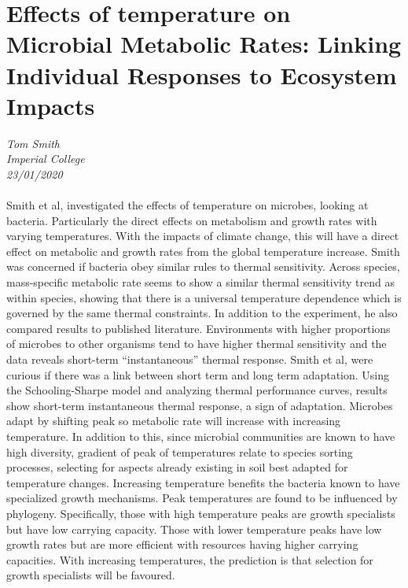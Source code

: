\documentclass[11pt]{article}
\begin{document}
\section{Effects of temperature on Microbial Metabolic Rates: Linking Individual Responses to Ecosystem Impacts}
\textit{Tom Smith\\Imperial College\\23/01/2020}
\\
\\Smith et al, investigated the effects of temperature on microbes, looking at bacteria. Particularly the direct effects on metabolism and growth rates with varying temperatures. With the impacts of climate change, this will have a direct effect on metabolic and growth rates from the global temperature increase. Smith was concerned if bacteria obey similar rules to thermal sensitivity. Across species, mass-specific metabolic rate seems to show a similar thermal sensitivity trend as within species, showing that there is a universal temperature dependence which is governed by the same thermal constraints. In addition to the experiment, he also compared results to published literature. Environments with higher proportions of microbes to other organisms tend to have higher thermal sensitivity and the data reveals short-term “instantaneous” thermal response. Smith et al, were curious if there was a link between short term and long term adaptation. Using the Schooling-Sharpe model and analyzing thermal performance curves, results show short-term instantaneous thermal response, a sign of adaptation. Microbes adapt by shifting peak so metabolic rate will increase with increasing temperature. In addition to this, since microbial communities are known to have high diversity, gradient of peak of temperatures relate to species sorting processes, selecting for aspects already existing in soil best adapted for temperature changes. Increasing temperature benefits the bacteria known to have specialized growth mechanisms. Peak temperatures are found to be influenced by phylogeny. Specifically, those with high temperature peaks are growth specialists but have low carrying capacity. Those with lower temperature peaks have low growth rates but are more efficient with resources having higher carrying capacities. With increasing temperatures, the prediction is that selection for growth specialists will be favoured.
\end{document}
